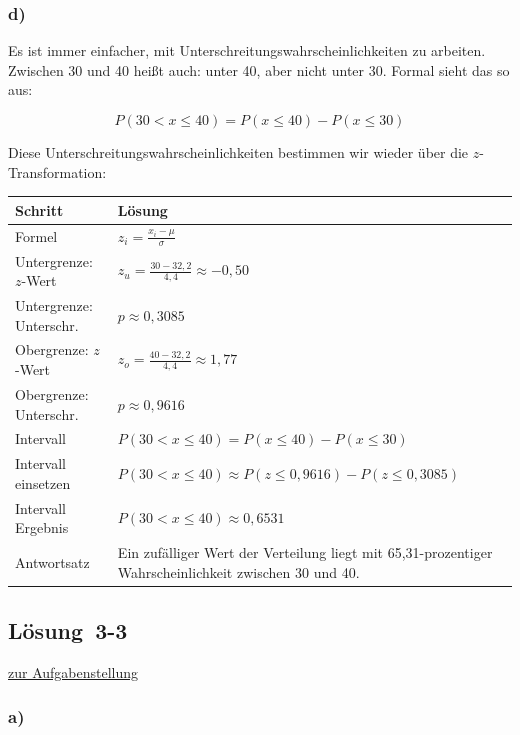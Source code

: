 \documentclass[
  11pt,
  ngerman,
  a4paper,
]{report}
\begin{document}
\hypertarget{d-2}{%
\subsubsection{d)}\label{d-2}}

Es ist immer einfacher, mit Unterschreitungs­wahrscheinlichkeiten zu arbeiten. Zwischen 30 und 40 heißt auch: unter 40, aber nicht unter 30. Formal sieht das so aus:

\[P(30 < x \leq 40) = P(x \leq 40) - P(x \leq 30)\]

Diese Unterschreitungs­wahrscheinlichkeiten bestimmen wir wieder über die \(z\)-Transformation:

\begin{table}[H]
\centering
\begin{tabular}{ll}
\toprule
\textbf{Schritt} & \textbf{Lösung}\\
\midrule
Formel & $z_{i} = \frac{x_{i} - \mu}{\sigma}$\\
Untergrenze: $z$-Wert & $z_{u}=\frac{30-32{,}2}{4{,}4}\approx-0{,}50$\\
Untergrenze: Unterschr. & $p \approx 0{,}3085$\\
Obergrenze: $z$-Wert & $z_{o}=\frac{40-32{,}2}{4{,}4}\approx1{,}77$\\
Obergrenze: Unterschr. & $p \approx 0{,}9616$\\
Intervall & $P(30 < x \leq 40) = P(x \leq 40) - P(x \leq 30)$\\
Intervall einsetzen & $P(30 < x \leq 40) \approx P(z \leq 0{,}9616) - P(z \leq 0{,}3085)$\\
Intervall Ergebnis & $P(30 < x \leq 40) \approx 0{,}6531$\\
Antwortsatz & Ein zufälliger Wert der Verteilung liegt mit 65,31-prozentiger Wahrscheinlichkeit zwischen 30 und 40.\\
\bottomrule
\end{tabular}
\end{table}

\hypertarget{loesung-3-3}{%
\subsection{Lösung~3-3}\label{loesung-3-3}}

\protect\hyperlink{aufgabe-3-3}{zur Aufgabenstellung}

\hypertarget{a-10}{%
\subsubsection{a)}\label{a-10}}
\end{document}
